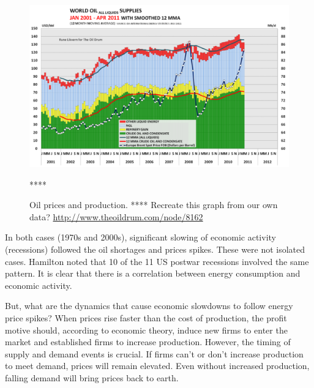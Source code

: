 \begin{figure}[!ht]
\centering\
\includegraphics[width=\linewidth]{Part_0/Chapter_Introduction/images/Oil_Prices.pdf}
\caption[Oil prices and production]{Oil prices and production.
**** Recreate this graph from our own data? \url{http://www.theoildrum.com/node/8162}} ****
\label{fig:oils_prices_and_production}
\end{figure}

In both cases (1970s and 2000s), 
significant slowing of economic activity (recessions)
followed the oil shortages and prices spikes.
These were not isolated cases.
Hamilton noted that 
10 of the 11 US postwar recessions 
involved the same pattern.\cite[p.~45]{Hamilton:2013vc}
It is clear that 
there is a correlation between energy consumption and economic activity.

But, what are the dynamics that cause economic slowdowns 
to follow energy price spikes?
When prices rise faster than the cost of production, 
the profit motive should, according to economic theory, induce 
new firms to enter the market and
established firms to increase production.
However, the timing of supply and demand events is crucial.
If firms can't or don't increase production to meet demand, 
prices will remain elevated.
Even without increased production, falling demand will 
bring prices back to earth.

